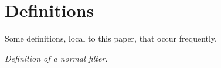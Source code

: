 \chapter{Definitions}
\label{chap:def}

Some definitions, local to this paper, that occur frequently.

\begin{definition}
  \label{def:normal_filter}
  \leanok
  \textit{Definition of a normal filter.}
\end{definition}
